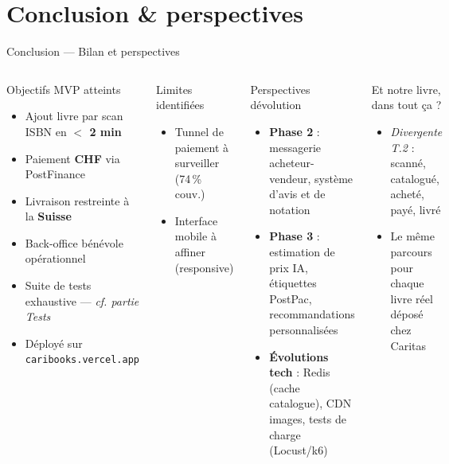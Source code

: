 \documentclass[aspectratio=169,10pt]{beamer}
\begin{document}
\section{Conclusion \& perspectives}

\begin{frame}{Conclusion --- Bilan et perspectives}
  \begin{columns}[T]
    \begin{exampleblock}{Objectifs MVP atteints}
      \begin{itemize}\small
        \item Ajout livre par scan ISBN en \textbf{$<$ 2 min}
        \item Paiement \textbf{CHF} via PostFinance
        \item Livraison restreinte à la \textbf{Suisse}
        \item Back-office bénévole opérationnel
        \item Suite de tests exhaustive --- \textit{cf. partie Tests}
        \item Déployé sur \texttt{caribooks.vercel.app}
      \end{itemize}
    \end{exampleblock}
    \vspace{4pt}
    \begin{alertblock}{Limites identifiées}
      \begin{itemize}\small
        \item Tunnel de paiement à surveiller (74\,\% couv.)
        \item Interface mobile à affiner (responsive)
      \end{itemize}
    \end{alertblock}
    \begin{block}{Perspectives d\textquotesingle{}évolution}
      \begin{itemize}\small
        \item \textbf{Phase 2} : messagerie acheteur-vendeur, système d'avis et de notation
        \item \textbf{Phase 3} : estimation de prix IA, étiquettes PostPac, recommandations personnalisées
        \item \textbf{Évolutions tech} : Redis (cache catalogue), CDN images, tests de charge (Locust/k6)
      \end{itemize}
    \end{block}
    \vspace{4pt}
    \begin{exampleblock}{\small Et notre livre, dans tout ça ?}
      \begin{itemize}\small
        \item \textit{Divergente T.2} : scanné, catalogué, acheté, payé, livré
        \item Le même parcours pour chaque livre réel déposé chez Caritas
      \end{itemize}
    \end{exampleblock}
  \end{columns}
\end{frame}
\end{document}
